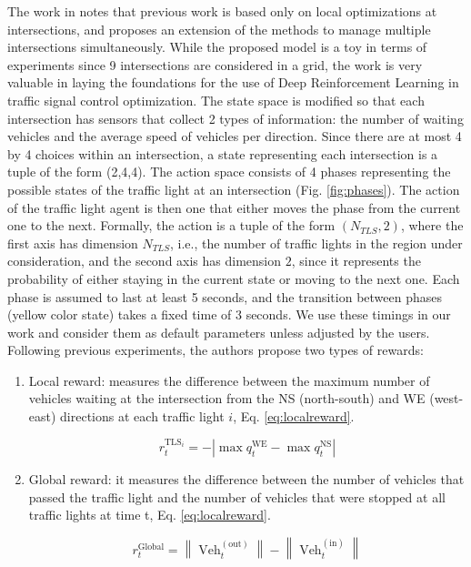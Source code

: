 \documentclass[a4paper,twoside]{article}
\begin{document}
The work in \cite{LiDa} notes that previous work is based only on local optimizations at intersections, and proposes an extension of the methods to manage multiple intersections simultaneously. While the proposed model is a toy in terms of experiments since 9 intersections are considered in a grid, the work is very valuable in laying the foundations for the use of Deep Reinforcement Learning in traffic signal control optimization. The state space is modified so that each intersection has sensors that collect 2 types of information: the number of waiting vehicles and the average speed of vehicles per direction. Since there are at most 4 by 4 choices within an intersection, a state representing each intersection is a tuple of the form (2,4,4). The action space consists of 4 phases representing the possible states of the traffic light at an intersection (Fig. \ref{fig:phases}). The action of the traffic light agent is then one that either moves the phase from the current one to the next. Formally, the action is a tuple of the form $(N_{TLS}, 2)$, where the first axis has dimension $N_{TLS}$, i.e., the number of traffic lights in the region under consideration, and the second axis has dimension $2$, since it represents the probability of either staying in the current state or moving to the next one. Each phase is assumed to last at least 5 seconds, and the transition between phases (yellow color state) takes a fixed time of 3 seconds. We use these timings in our work and consider them as default parameters unless adjusted by the users. Following previous experiments, the authors propose two types of rewards:

\begin{enumerate}
	\item Local reward: measures the difference between the maximum number of vehicles waiting at the intersection from the NS (north-south) and WE (west-east) directions at each traffic light $i$, Eq. \ref{eq:localreward}.
	
	\begin{equation} \label{eq:localreward}
		r_{t}^{\mathrm{TLS}_{i}}=-\left|\max q_{t}^{\mathrm{ WE }}-\max q_{t}^{\mathrm{ NS }}\right|
	\end{equation}
	
	
	\item Global reward: it measures the difference between the number of vehicles that passed the traffic light and the number of vehicles that were stopped at all traffic lights at time t, Eq. \ref{eq:localreward}.
	
	\begin{equation} \label{eq:globalreward}
		r_{t}^{\mathrm{Global}}=\left\|\operatorname{Veh}_{t}^{(\mathrm{out})}\right\|-\left\|\operatorname{Veh}_{t}^{(\mathrm{in})}\right\|
	\end{equation}
\end{enumerate} 
\end{document}

